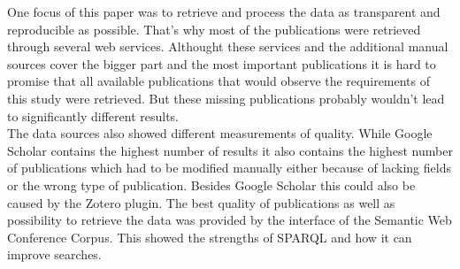\documentclass[english]{lni}
\begin{document}
  One focus of this paper was to retrieve and process the data as transparent
  and reproducible as possible. That's why most of the publications were
  retrieved through several web services. Althought these services and the
  additional manual sources cover the bigger part and the most important
  publications it is hard to promise that all available publications that would
  observe the requirements of this study were retrieved. But these missing
  publications probably wouldn't lead to significantly different results.\\
  The data sources also showed different measurements of quality. While Google
  Scholar contains the highest number of results it also contains the highest
  number of publications which had to be modified manually either because of lacking
  fields or the wrong type of publication. Besides Google Scholar this could
  also be caused by the Zotero plugin. The best quality of publications as well
  as possibility to retrieve the data was provided by the interface of the Semantic
  Web Conference Corpus. This showed the strengths of SPARQL and how it can improve searches.



\end{document}

